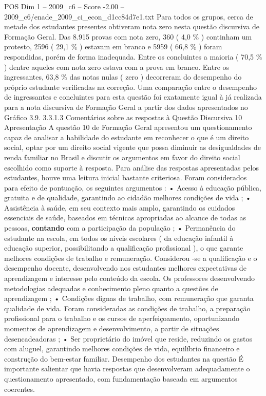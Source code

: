 \begin{textsample}{POS Dim 1 – 2009\_c6 – Score -2.00 – 2009\_c6/enade\_2009\_ci\_econ\_d1cc84d7e1.txt}
Para todos os grupos, cerca de metade dos estudantes presentes obtiveram nota zero nesta questão discursiva de Formação Geral.
Das 8.915 provas com nota zero, 360 ( 4,0 \% ) continham um protesto, 2596 ( 29,1 \% ) estavam em branco e 5959 ( 66,8 \% ) foram respondidas, porém de forma inadequada.
Entre os concluintes a maioria ( 70,5 \% ) dentre aqueles com nota zero estava com a prova em branco.
Entre os ingressantes, 63,8 \% das notas nulas ( zero ) decorreram do desempenho do próprio estudante verificadas na correção.
Uma comparação entre o desempenho de ingressantes e concluintes para esta questão foi exatamente igual à já realizada para a nota discursiva de Formação Geral a partir dos dados apresentados no Gráfico 3.9. 3.3.1.3 Comentários sobre as respostas à Questão Discursiva 10 Apresentação A questão 10 de Formação Geral apresentou um questionamento capaz de analisar a habilidade do estudante em reconhecer o que é um direito social, optar por um direito social vigente que possa diminuir as desigualdades de renda familiar no Brasil e discutir os argumentos em favor do direito social escolhido como suporte à resposta.
Para análise das respostas apresentadas pelos estudantes, houve uma leitura inicial bastante criteriosa.
Foram considerados para efeito de pontuação, os seguintes argumentos : • Acesso à educação pública, gratuita e de qualidade, garantindo ao cidadão melhores condições de vida ; • Assistência à saúde, em seu contexto mais amplo, garantindo os cuidados essenciais de saúde, baseados em técnicas apropriadas ao alcance de todas as pessoas, \textbf{contando} com a participação da população ; • Permanência do estudante na escola, em todos os níveis escolares ( da educação infantil à educação superior, possibilitando a qualificação profissional ), o que garante melhores condições de trabalho e remuneração.
Considerou -se a qualificação e o desempenho docente, desenvolvendo nos estudantes melhores expectativas de aprendizagem e interesse pelo conteúdo da escola.
Os professores desenvolvendo metodologias adequadas e conhecimento pleno quanto a questões de aprendizagem ; • Condições dignas de trabalho, com remuneração que garanta qualidade de vida.
Foram consideradas as condições de trabalho, a preparação profissional para o trabalho e os cursos de aperfeiçoamento, oportunizando momentos de aprendizagem e desenvolvimento, a partir de situações desencadeadoras ; • Ser proprietário do imóvel que reside, reduzindo os gastos com aluguel, garantindo melhores condições de vida, equilíbrio financeiro e construção do bem-estar familiar.
Desempenho dos estudantes na questão É importante salientar que havia respostas que desenvolveram adequadamente o questionamento apresentado, com fundamentação baseada em argumentos coerentes.

\end{textsample}
